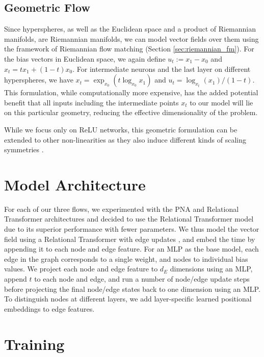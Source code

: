 \subsection{Geometric Flow}

Since hyperspheres, as well as the Euclidean space and a product of Riemannian manifolds, are Riemannian manifolds, we can model vector fields over them using the framework of Riemannian flow matching \citep{chenRiemannianFlowMatching2023} (Section \ref{sec:riemannian_fm}). For the bias vectors in Euclidean space, we again define $u_t := x_1 - x_0$ and $x_t = t x_1 + (1-t) x_0$. For intermediate neurons and the last layer on different hyperspheres, we have $x_t = \exp_{x_0}(t \log_{x_0}x_1)$ and $u_t = \log_{x_t}(x_1) / (1-t)$. This formulation, while computationally more expensive, has the added potential benefit that all inputs including the intermediate points $x_t$ to our model will lie on this particular geometry, reducing the effective dimensionality of the problem. 

While we focus only on ReLU networks, this geometric formulation can be extended to other non-linearities as they also induce different kinds of scaling symmetries \citep{godfreySymmetriesDeepLearning2022}. 

\section{Model Architecture}

For each of our three flows, we experimented with the PNA and Relational Transformer architectures and decided to use the Relational Transformer model due to its superior performance with fewer parameters. We thus model the vector field using a Relational Transformer with edge updates \citep{diaoRelationalAttentionGeneralizing2023,kofinasGraphNeuralNetworks2024}, and embed the time by appending it to each node and edge feature. For an MLP as the base model, each edge in the graph corresponds to a single weight, and nodes to individual bias values. We project each node and edge feature to $d_E$ dimensions using an MLP, append $t$ to each node and edge, and run a number of node/edge update steps before projecting the final node/edge states back to one dimension using an MLP. To distinguish nodes at different layers, we add layer-specific learned positional embeddings to edge features. 

\section{Training}


